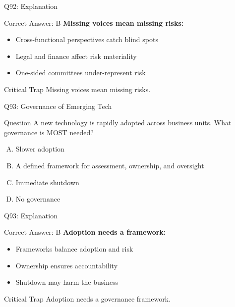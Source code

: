 \documentclass{beamer}
\begin{document}
	\begin{frame}{Q92: Explanation}
		\begin{block}{Correct Answer: B}
			\textbf{Missing voices mean missing risks:}
			\begin{itemize}
				\item Cross-functional perspectives catch blind spots
				\item Legal and finance affect risk materiality
				\item One-sided committees under-represent risk
			\end{itemize}
		\end{block}
		\begin{alertblock}{Critical Trap}
			Missing voices mean missing risks.
		\end{alertblock}
	\end{frame}
	
	\begin{frame}{Q93: Governance of Emerging Tech}
		\begin{block}{Question}
			A new technology is rapidly adopted across business units. What governance is MOST needed?
		\end{block}
		\begin{enumerate}[(A)]
			\item Slower adoption
			\item A defined framework for assessment, ownership, and oversight
			\item Immediate shutdown
			\item No governance
		\end{enumerate}
	\end{frame}
	
	\begin{frame}{Q93: Explanation}
		\begin{block}{Correct Answer: B}
			\textbf{Adoption needs a framework:}
			\begin{itemize}
				\item Frameworks balance adoption and risk
				\item Ownership ensures accountability
				\item Shutdown may harm the business
			\end{itemize}
		\end{block}
		\begin{alertblock}{Critical Trap}
			Adoption needs a governance framework.
		\end{alertblock}
	\end{frame}
	
\end{document}
